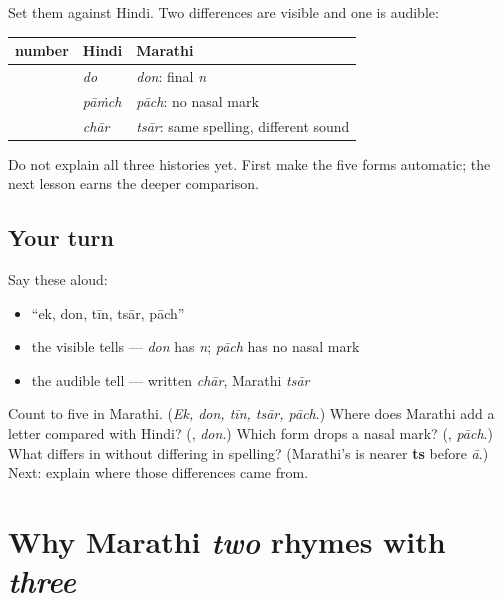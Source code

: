 \begin{grammarlens}[title={What you've built: three Marathi tells}]
Set them against Hindi. Two differences are visible and one is audible:

\noindent
\begin{tabularx}{\linewidth}{@{}>{\raggedright\arraybackslash}X>{\raggedright\arraybackslash}X>{\raggedright\arraybackslash}X@{}}
\toprule
\textbf{number} & \textbf{Hindi} & \textbf{Marathi} \\
\midrule
2 & \mr{दो} \emph{do} & \textbf{\mr{दोन}} \emph{don}: final \emph{n} \\
5 & \mr{पाँच} \emph{pāṁch} & \textbf{\mr{पाच}} \emph{pāch}: no nasal mark \\
4 & \mr{चार} \emph{chār} & \textbf{\mr{चार}} \emph{tsār}: same spelling, different sound \\
\bottomrule
\end{tabularx}

Do not explain all three histories yet. First make the five forms automatic; the next lesson earns the deeper comparison.
\end{grammarlens}

\subsection*{Your turn}
Say these aloud:

\begin{itemize}
\raggedright
  \item \textquotedblleft{}ek, don, tīn, tsār, pāch\textquotedblright{}
  \item the visible tells — \emph{don} has \emph{n}; \emph{pāch} has no nasal mark
  \item the audible tell — written \emph{chār}, Marathi \emph{tsār}
\end{itemize}

\begin{tcolorbox}[breakable,colback=teal!4,colframe=teal!35!black,title={Before you move on}]
Count to five in Marathi. (\emph{Ek, don, tīn, tsār, pāch}.) Where does Marathi add a letter compared with Hindi? (\textbf{}, \emph{don}.) Which form drops a nasal mark? (\textbf{}, \emph{pāch}.) What differs in \textbf{} without differing in spelling? (Marathi's \textbf{} is nearer \textbf{ts} before \emph{ā}.) Next: explain where those differences came from.
\end{tcolorbox}
\section[don · tīn · pāch · chār]{Why Marathi \emph{two} rhymes with \emph{three}}


